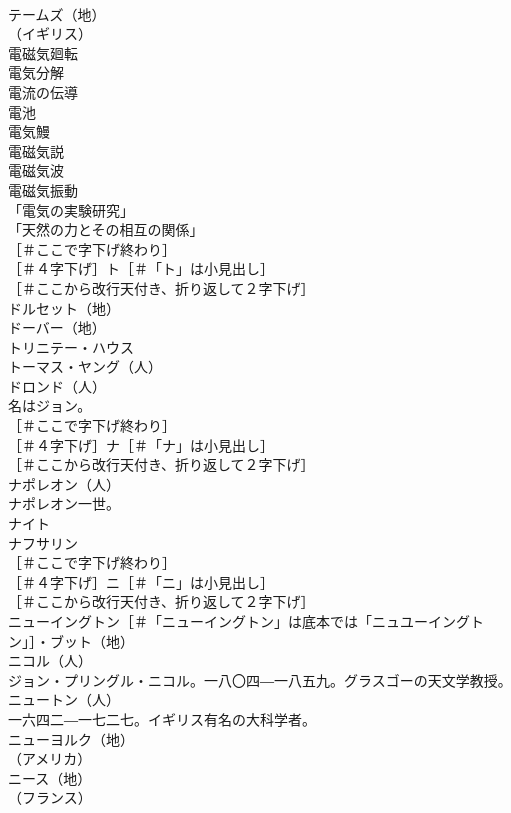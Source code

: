 \documentclass[8pt]{extreport}
\begin{document}
\begin{CJK}{UTF8}{min}
\\	テームズ（地）
\\	（イギリス）
\\	電磁気廻転 
\\	電気分解 
\\	電流の伝導 
\\	電池 
\\	電気鰻 
\\	電磁気説 
\\	電磁気波 
\\	電磁気振動 
\\	「電気の実験研究」 
\\	「天然の力とその相互の関係」 
\\	［＃ここで字下げ終わり］
\\	［＃４字下げ］ト［＃「ト」は小見出し］
\\	［＃ここから改行天付き、折り返して２字下げ］
\\	ドルセット（地）
\\	ドーバー（地）
\\	トリニテー・ハウス 
\\	トーマス・ヤング（人）
\\	ドロンド（人）
\\	名はジョン。
\\	［＃ここで字下げ終わり］
\\	［＃４字下げ］ナ［＃「ナ」は小見出し］
\\	［＃ここから改行天付き、折り返して２字下げ］
\\	ナポレオン（人）
\\	ナポレオン一世。
\\	ナイト 
\\	ナフサリン 
\\	［＃ここで字下げ終わり］
\\	［＃４字下げ］ニ［＃「ニ」は小見出し］
\\	［＃ここから改行天付き、折り返して２字下げ］
\\	ニューイングトン［＃「ニューイングトン」は底本では「ニュユーイングトン」］・ブット（地）
\\	ニコル（人）
\\	ジョン・プリングル・ニコル。一八〇四―一八五九。グラスゴーの天文学教授。
\\	ニュートン（人）
\\	一六四二―一七二七。イギリス有名の大科学者。
\\	ニューヨルク（地）
\\	（アメリカ）
\\	ニース（地）
\\	（フランス）

\end{CJK}
\end{document}
